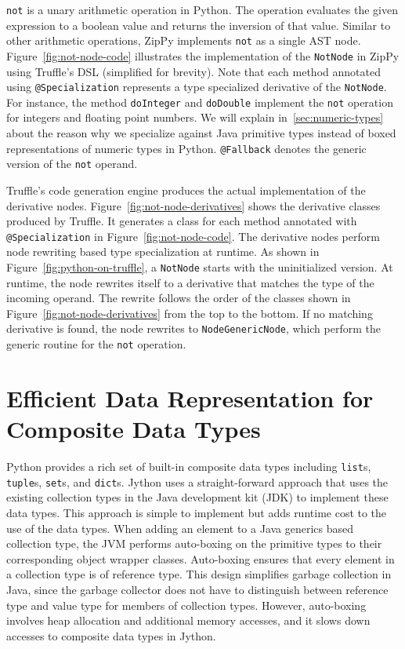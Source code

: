\texttt{not} is a unary arithmetic operation in Python.
The operation evaluates the given expression to a boolean value and returns the inversion of that value.
Similar to other arithmetic operations, ZipPy implements \texttt{not} as a single AST node.
Figure~\ref{fig:not-node-code} illustrates the implementation of the \texttt{NotNode} in ZipPy using Truffle's DSL (simplified for brevity).
Note that each method annotated using \texttt{@Specialization} represents a type specialized derivative of the \texttt{NotNode}.
For instance, the method \texttt{doInteger} and \texttt{doDouble} implement the \texttt{not} operation for integers and floating point numbers.
We will explain in~\ref{sec:numeric-types} about the reason why we specialize against Java primitive types instead of boxed representations of numeric types in Python.
\texttt{@Fallback} denotes the generic version of the \texttt{not} operand.

Truffle's code generation engine produces the actual implementation of the derivative nodes.
Figure~\ref{fig:not-node-derivatives} shows the derivative classes produced by Truffle.
It generates a class for each method annotated with \texttt{@Specialization} in Figure~\ref{fig:not-node-code}.
The derivative nodes perform node rewriting based type specialization at runtime.
As shown in Figure~\ref{fig:python-on-truffle}, a \texttt{NotNode} starts with the uninitialized version.
At runtime, the node rewrites itself to a derivative that matches the type of the incoming operand.
The rewrite follows the order of the classes shown in Figure~\ref{fig:not-node-derivatives} from the top to the bottom.
If no matching derivative is found, the node rewrites to \texttt{NodeGenericNode}, which perform the generic routine for the \texttt{not} operation.

\section{Efficient Data Representation for Composite Data Types}

Python provides a rich set of built-in composite data types including \texttt{list}s, \texttt{tuple}s, \texttt{set}s, and \texttt{dict}s.
Jython uses a straight-forward approach that uses the existing collection types in the Java development kit (JDK) to implement these data types.
This approach is simple to implement but adds runtime cost to the use of the data types.
When adding an element to a Java generics based collection type, the JVM performs auto-boxing on the primitive types to their corresponding object wrapper classes.
Auto-boxing ensures that every element in a collection type is of reference type.
This design simplifies garbage collection in Java, since the garbage collector does not have to distinguish between reference type and value type for members of collection types.
However, auto-boxing involves heap allocation and additional memory accesses, and it slows down accesses to composite data types in Jython.

